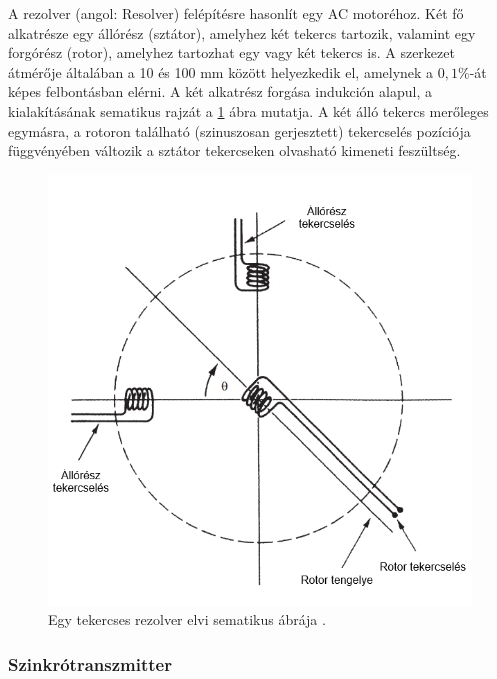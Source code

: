 A rezolver (angol: Resolver) felépítésre hasonlít egy AC motoréhoz. Két fő alkatrésze egy állórész (sztátor), amelyhez két tekercs tartozik, valamint egy forgórész (rotor), amelyhez tartozhat egy vagy két tekercs is. A szerkezet átmérője általában a 10 és 100 mm között helyezkedik el, amelynek a $0,1\%$-át képes felbontásban elérni. A két alkatrész forgása indukción alapul, a kialakításának sematikus rajzát a \ref{rezolver} ábra mutatja. A két álló tekercs merőleges egymásra, a rotoron található (szinuszosan gerjesztett) tekercselés pozíciója függvényében változik a sztátor tekercseken olvasható kimeneti feszültség.
\begin{figure}
	\centering
	\includegraphics[width=\columnwidth/2]{figures/rezolver.png}
	\caption{Egy tekercses rezolver elvi sematikus ábrája \cite{Morris2016b}.}
	\label{rezolver}
\end{figure}

\subsubsection{Szinkrótranszmitter}

